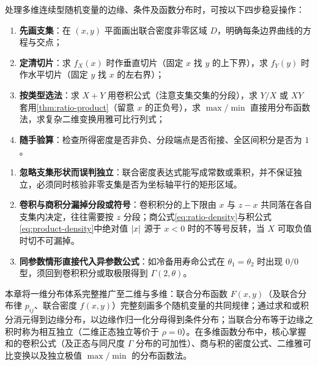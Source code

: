 \begin{method}[二维函数分布与积分定限的通用策略]
处理多维连续型随机变量的边缘、条件及函数分布时，可按以下四步稳妥操作：
\begin{enumerate}
  \item \textbf{先画支集}：在 $(x,y)$ 平面画出联合密度非零区域 $D$，明确每条边界曲线的方程与交点；
  \item \textbf{定清切片}：求 $f_X(x)$ 时作垂直切片（固定 $x$ 找 $y$ 的上下界），求 $f_Y(y)$ 时作水平切片（固定 $y$ 找 $x$ 的左右界）；
  \item \textbf{按类型选法}：求 $X+Y$ 用卷积公式（注意支集交集的分段），求 $Y/X$ 或 $XY$ 套用\cref{thm:ratio-product}（留意 $x$ 的正负号），求 $\max/\min$ 直接用分布函数法，求复杂二维变换用雅可比行列式；
  \item \textbf{随手验算}：检查所得密度是否非负、分段端点是否衔接、全区间积分是否为 $1$。
\end{enumerate}
\end{method}

\begin{pitfall}[多维分布中的三类常见误区]
\begin{enumerate}
  \item \textbf{忽略支集形状而误判独立}：联合密度表达式能写成常数或乘积，并不保证独立，必须同时核验非零支集是否为坐标轴平行的矩形区域。
  \item \textbf{卷积与商积分漏掉分段或符号}：卷积积分的上下限由 $x$ 与 $z-x$ 共同落在各自支集内决定，往往需要按 $z$ 分段；商公式\eqref{eq:ratio-density}与积公式\eqref{eq:product-density}中绝对值 $\lvert x\rvert$ 源于 $x<0$ 时的不等号反转，当 $X$ 可取负值时切不可漏掉。
  \item \textbf{同参数情形直接代入异参数公式}：如冷备用寿命公式在 $\theta_1=\theta_2$ 时出现 $0/0$ 型，须回到卷积积分或取极限得到 $\Gamma(2,\theta)$。
\end{enumerate}
\end{pitfall}

\begin{summary}[第三章核心脉络]
本章将一维分布体系完整推广至二维与多维：联合分布函数 $F(x,y)$（及联合分布律 $p_{ij}$、联合密度 $f(x,y)$）完整刻画多个随机变量的共同规律；通过求和或积分消元得到边缘分布，以边缘作归一化分母得到条件分布；当联合分布等于边缘之积时称为相互独立（二维正态独立等价于 $\rho=0$）。在多维函数分布中，核心掌握和的卷积公式（及正态与同尺度 $\Gamma$ 分布的可加性）、商与积的密度公式、二维雅可比变换以及独立极值 $\max/\min$ 的分布函数法。
\end{summary}
